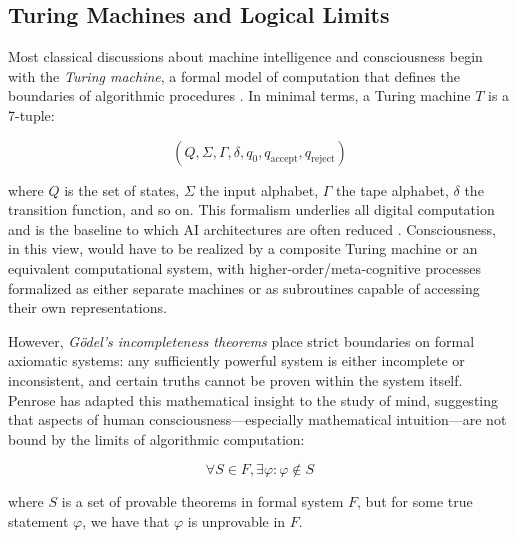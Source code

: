 \subsection{Turing Machines and Logical Limits}
\label{subsec:turing_limits}

Most classical discussions about machine intelligence and consciousness begin with the \emph{Turing machine}, a formal model of computation that defines the boundaries of algorithmic procedures \cite{turing1937computable}. In minimal terms, a Turing machine $T$ is a 7-tuple:

\vspace{-2.0\baselineskip}
\begin{equation}
(Q, \Sigma, \Gamma, \delta, q_0, q_{\text{accept}}, q_{\text{reject}})
\label{eq:turing_machine}
\end{equation}
\vspace{-2.0\baselineskip}

where $Q$ is the set of states, $\Sigma$ the input alphabet, $\Gamma$ the tape alphabet, $\delta$ the transition function, and so on. This formalism underlies all digital computation and is the baseline to which AI architectures are often reduced \cite{reggia2013rise}. Consciousness, in this view, would have to be realized by a composite Turing machine or an equivalent computational system, with higher-order/meta-cognitive processes formalized as either separate machines or as subroutines capable of accessing their own representations.

However, \emph{Gödel's incompleteness theorems} \cite{godel1931formal} place strict boundaries on formal axiomatic systems: any sufficiently powerful system is either incomplete or inconsistent, and certain truths cannot be proven within the system itself. Penrose \cite{penrose1990emperors} has adapted this mathematical insight to the study of mind, suggesting that aspects of human consciousness---especially mathematical intuition---are not bound by the limits of algorithmic computation:

\vspace{-2.0\baselineskip}
\begin{equation}
\forall S \in F, \exists \varphi : \varphi \notin S
\label{eq:godel_incompleteness}
\end{equation}
\vspace{-2.0\baselineskip}

where $S$ is a set of provable theorems in formal system $F$, but for some true statement $\varphi$, we have that $\varphi$ is unprovable in $F$.

